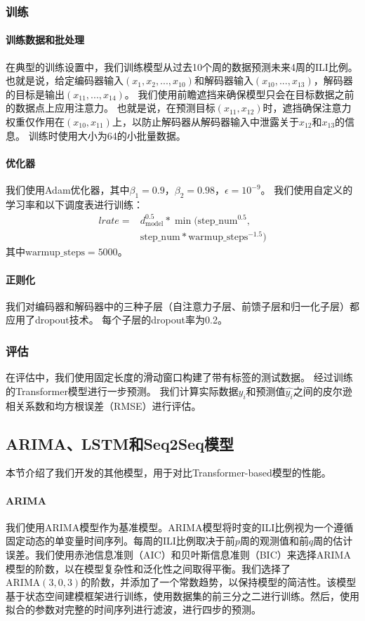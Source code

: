 \subsubsection{训练}
\paragraph*{训练数据和批处理}
在典型的训练设置中，我们训练模型从过去10个周的数据预测未来4周的ILI比例。
也就是说，给定编码器输入$(x_1, x_2, ..., x_{10})$和解码器输入$(x_{10}, ..., x_{13})$，解码器的目标是输出$(x_{11}, ..., x_{14})$。
我们使用前瞻遮挡来确保模型只会在目标数据之前的数据点上应用注意力。
也就是说，在预测目标$(x_{11}, x_{12})$时，遮挡确保注意力权重仅作用在$(x_{10}, x_{11})$上，以防止解码器从解码器输入中泄露关于$x_{12}$和$x_{13}$的信息。
训练时使用大小为64的小批量数据。
\paragraph*{优化器}
我们使用Adam优化器，其中$\beta_1 = 0.9$，$\beta_2 = 0.98$，$\epsilon = 10^{-9}$。
我们使用自定义的学习率和以下调度表进行训练：
\begin{align*}
lrate = &d_{\text{model}}^{0.5} * \min(\text{step\_num}^{0.5},\\
        &\text{step\_num} * \text{warmup\_steps}^{-1.5})
\end{align*}
其中$\text{warmup\_steps} = 5000$。

\paragraph*{正则化}
我们对编码器和解码器中的三种子层（自注意力子层、前馈子层和归一化子层）都应用了dropout技术。
每个子层的dropout率为0.2。

\subsubsection{评估}
在评估中，我们使用固定长度的滑动窗口构建了带有标签的测试数据。
经过训练的Transformer模型进行一步预测。
我们计算实际数据${y_i}$和预测值${\hat{y_i}}$之间的皮尔逊相关系数和均方根误差（RMSE）进行评估。
\subsection{ARIMA、LSTM和Seq2Seq模型}
本节介绍了我们开发的其他模型，用于对比Transformer-based模型的性能。

\paragraph*{ARIMA}
我们使用ARIMA模型作为基准模型。ARIMA模型将时变的ILI比例视为一个遵循固定动态的单变量时间序列。每周的ILI比例取决于前$p$周的观测值和前$q$周的估计误差。我们使用赤池信息准则（AIC）和贝叶斯信息准则（BIC）来选择ARIMA模型的阶数，以在模型复杂性和泛化性之间取得平衡。我们选择了$\mathrm{ARIMA}(3,0,3)$的阶数，并添加了一个常数趋势，以保持模型的简洁性。该模型基于状态空间建模框架进行训练，使用数据集的前三分之二进行训练。然后，使用拟合的参数对完整的时间序列进行滤波，进行四步的预测。

